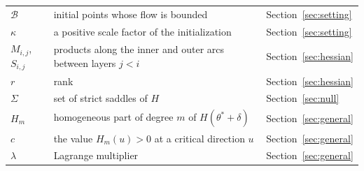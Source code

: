 \begin{center}
\begin{tabular}{@{}lp{}l@{}}
$\mathcal{B}$ & initial points whose flow is bounded & Section~\ref{sec:setting} \\
$\kappa$ & a positive scale factor of the initialization & Section~\ref{sec:setting} \\
$M_{i,j}$, $S_{i,j}$ & products along the inner and outer arcs between layers $j<i$ & Section~\ref{sec:hessian} \\
$r$ & rank & Section~\ref{sec:hessian} \\
$\Sigma$ & set of strict saddles of $H$ & Section~\ref{sec:null} \\
$H_m$ & homogeneous part of degree $m$ of $H(\theta^*+\delta)$ & Section~\ref{sec:general} \\
$c$ & the value $H_m(u)>0$ at a critical direction $u$ & Section~\ref{sec:general} \\
$\lambda$ & Lagrange multiplier & Section~\ref{sec:general} \\ \bottomrule
\end{tabular}\end{center}
